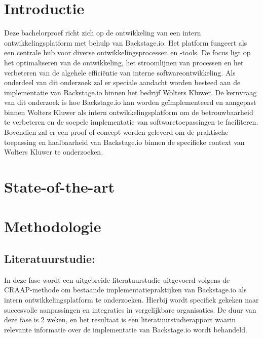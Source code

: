 
\section{Introductie}%
\label{sec:introductie}

Deze bachelorproef richt zich op de ontwikkeling van een intern ontwikkelingsplatform met behulp van Backstage.io. Het platform fungeert als een centrale hub voor diverse ontwikkelingsprocessen en -tools. De focus ligt op het optimaliseren van de ontwikkeling, het stroomlijnen van processen en het verbeteren van de algehele efficiëntie van interne softwareontwikkeling. Als onderdeel van dit onderzoek zal er speciale aandacht worden besteed aan de implementatie van Backstage.io binnen het bedrijf Wolters Kluwer. De kernvraag van dit onderzoek is hoe Backstage.io kan worden geïmplementeerd en aangepast binnen Wolters Kluwer als intern ontwikkelingsplatform om de betrouwbaarheid te verbeteren en de soepele implementatie van softwaretoepassingen te faciliteren. Bovendien zal er een proof of concept worden geleverd om de praktische toepassing en haalbaarheid van Backstage.io binnen de specifieke context van Wolters Kluwer te onderzoeken.







\section{State-of-the-art}%
\label{sec:state-of-the-art}



\section{Methodologie}%
\label{sec:methodologie}
\subsection{Literatuurstudie:}
In deze fase wordt een uitgebreide literatuurstudie uitgevoerd volgens de CRAAP-methode om bestaande implementatiepraktijken van Backstage.io als intern ontwikkelingsplatform te onderzoeken. Hierbij wordt specifiek gekeken naar succesvolle aanpassingen en integraties in vergelijkbare organisaties. De duur van deze fase is 2 weken, en het resultaat is een literatuurstudierapport waarin relevante informatie over de implementatie van Backstage.io wordt behandeld.

